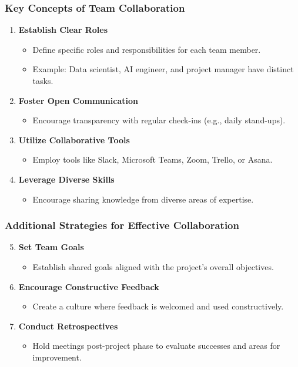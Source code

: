 \documentclass[aspectratio=169]{beamer}
\begin{document}
\begin{frame}[fragile]
    \frametitle{Key Concepts of Team Collaboration}
    \begin{enumerate}
        \item \textbf{Establish Clear Roles}
            \begin{itemize}
                \item Define specific roles and responsibilities for each team member.
                \item Example: Data scientist, AI engineer, and project manager have distinct tasks.
            \end{itemize}
        \item \textbf{Foster Open Communication}
            \begin{itemize}
                \item Encourage transparency with regular check-ins (e.g., daily stand-ups).
            \end{itemize}
        \item \textbf{Utilize Collaborative Tools}
            \begin{itemize}
                \item Employ tools like Slack, Microsoft Teams, Zoom, Trello, or Asana.
            \end{itemize}
        \item \textbf{Leverage Diverse Skills}
            \begin{itemize}
                \item Encourage sharing knowledge from diverse areas of expertise.
            \end{itemize}
    \end{enumerate}
\end{frame}

\begin{frame}[fragile]
    \frametitle{Additional Strategies for Effective Collaboration}
    \begin{enumerate}
        \setcounter{enumi}{4} %
        \item \textbf{Set Team Goals}
            \begin{itemize}
                \item Establish shared goals aligned with the project’s overall objectives.
            \end{itemize}
        \item \textbf{Encourage Constructive Feedback}
            \begin{itemize}
                \item Create a culture where feedback is welcomed and used constructively.
            \end{itemize}
        \item \textbf{Conduct Retrospectives}
            \begin{itemize}
                \item Hold meetings post-project phase to evaluate successes and areas for improvement.
            \end{itemize}
    \end{enumerate}
\end{frame}
\end{document}
